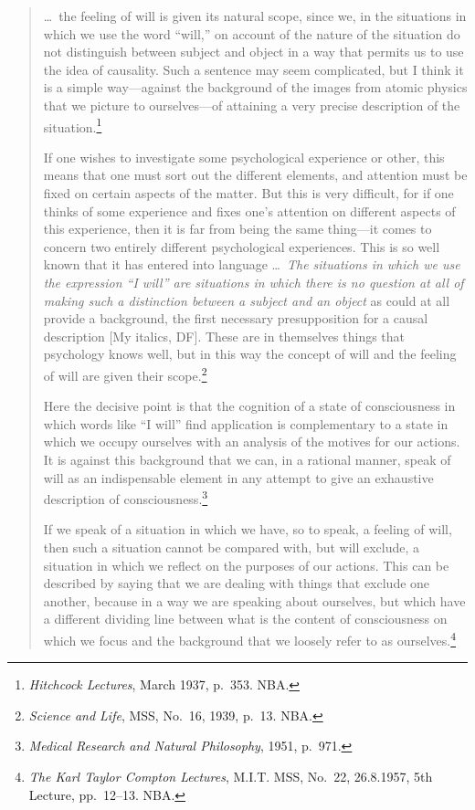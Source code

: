 \documentclass[12pt,a4paper]{book}
\begin{document}
\begin{quote}
\dots\ the feeling of will is given its natural scope, since we, in the situations in which we use the word ``will,'' on account of the nature of the situation do not distinguish between subject and object in a way that permits us to use the idea of causality. Such a sentence may seem complicated, but I think it is a simple way---against the background of the images from atomic physics that we picture to ourselves---of attaining a very precise description of the situation.\footnote{\emph{Hitchcock Lectures}, March 1937, p.~353. NBA.}

If one wishes to investigate some psychological experience or other, this means that one must sort out the different elements, and attention must be fixed on certain aspects of the matter. But this is very difficult, for if one thinks of some experience and fixes one's attention on different aspects of this experience, then it is far from being the same thing---it comes to concern two entirely different psychological experiences. This is so well known that it has entered into language \dots\ \emph{The situations in which we use the expression ``I will'' are situations in which there is no question at all of making such a distinction between a subject and an object} as could at all provide a background, the first necessary presupposition for a causal description [My italics, DF]. These are in themselves things that psychology knows well, but in this way the concept of will and the feeling of will are given their scope.\footnote{\emph{Science and Life}, MSS, No.~16, 1939, p.~13. NBA.}

Here the decisive point is that the cognition of a state of consciousness in which words like ``I will'' find application is complementary to a state in which we occupy ourselves with an analysis of the motives for our actions. It is against this background that we can, in a rational manner, speak of will as an indispensable element in any attempt to give an exhaustive description of consciousness.\footnote{\emph{Medical Research and Natural Philosophy}, 1951, p.~971.}

If we speak of a situation in which we have, so to speak, a feeling of will, then such a situation cannot be compared with, but will exclude, a situation in which we reflect on the purposes of our actions. This can be described by saying that we are dealing with things that exclude one another, because in a way we are speaking about ourselves, but which have a different dividing line between what is the content of consciousness on which we focus and the background that we loosely refer to as ourselves.\footnote{\emph{The Karl Taylor Compton Lectures}, M.I.T. MSS, No.~22, 26.8.1957, 5th Lecture, pp.~12--13. NBA.}
\end{quote}
\end{document}
